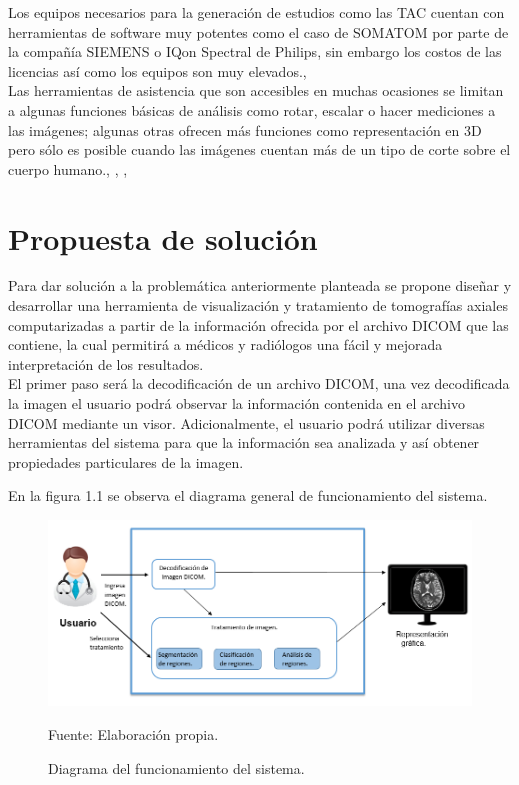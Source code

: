 \documentclass[12pt]{report}
\begin{document}
Los equipos necesarios para la generación de estudios como las TAC cuentan con herramientas de software muy potentes como el caso de SOMATOM por parte de la compañía SIEMENS o IQon Spectral de Philips, sin embargo los costos de las licencias así como los equipos son muy elevados.\cite{guia}, \cite{guiad}\\

Las herramientas de asistencia que son accesibles en muchas ocasiones se limitan a algunas funciones básicas de análisis como rotar, escalar o hacer mediciones a las imágenes; algunas otras ofrecen más funciones como representación en 3D pero sólo es posible cuando las imágenes  cuentan más de un tipo de corte sobre el cuerpo humano.\cite{occi}, \cite{nifty}, \cite{osirix}, \cite{3dim}\\

\section{Propuesta de solución}
Para dar solución a la problemática anteriormente planteada se propone diseñar y desarrollar una herramienta de visualización y tratamiento de tomografías axiales computarizadas a partir de la información ofrecida por el archivo DICOM que las contiene, la cual permitirá a médicos y radiólogos una fácil y mejorada interpretación de  los resultados.\\

El primer paso será la decodificación de un archivo DICOM, una vez decodificada la imagen el usuario podrá observar la información contenida en el archivo DICOM mediante un visor. Adicionalmente, el usuario podrá utilizar diversas herramientas del sistema para que la información sea analizada y así obtener propiedades particulares de la imagen.

En la figura 1.1 se observa el diagrama general de funcionamiento del sistema.
\begin{figure}[H]
\centering
\includegraphics[width = 12 cm, height = 7 cm]{diagramageneral}
\caption{Diagrama del funcionamiento del sistema.}
Fuente: Elaboración propia.
\end{figure}
\end{document}

